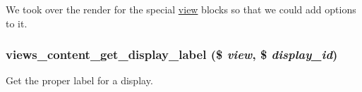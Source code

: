We took over the render for the special \hyperlink{classview}{view} blocks so that we could add options to it. \hypertarget{views__content_8module_a6f9d793243f30134f214f74c1b3c3da5}{
\subsubsection[{views\_\-content\_\-get\_\-display\_\-label}]{\setlength{\rightskip}{0pt plus 5cm}views\_\-content\_\-get\_\-display\_\-label (\$ {\em view}, \/  \$ {\em display\_\-id})}}
\label{views__content_8module_a6f9d793243f30134f214f74c1b3c3da5}
Get the proper label for a display.

